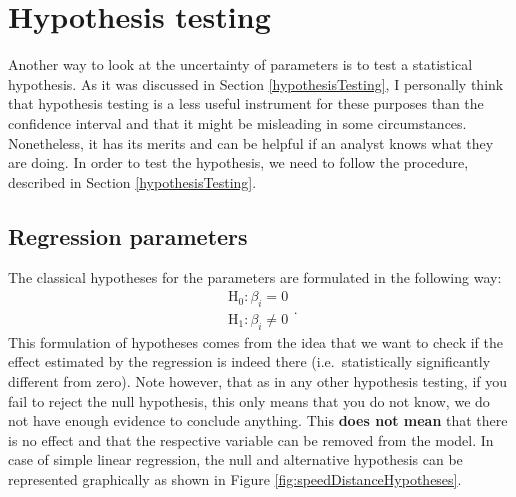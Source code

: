 \documentclass[
]{book}
\theoremstyle{definition}
\theoremstyle{definition}
\theoremstyle{definition}
\theoremstyle{definition}
\theoremstyle{remark}
\begin{document}
\hypertarget{hypothesis-testing}{%
\section{Hypothesis testing}\label{hypothesis-testing}}

Another way to look at the uncertainty of parameters is to test a statistical hypothesis. As it was discussed in Section \ref{hypothesisTesting}, I personally think that hypothesis testing is a less useful instrument for these purposes than the confidence interval and that it might be misleading in some circumstances. Nonetheless, it has its merits and can be helpful if an analyst knows what they are doing. In order to test the hypothesis, we need to follow the procedure, described in Section \ref{hypothesisTesting}.

\hypertarget{regression-parameters}{%
\subsection{Regression parameters}\label{regression-parameters}}

The classical hypotheses for the parameters are formulated in the following way:
\begin{equation}
    \begin{aligned}
        \mathrm{H}_0: \beta_i = 0 \\
        \mathrm{H}_1: \beta_i \neq 0
    \end{aligned} .
    \label{eq:regressionHypothesis01}
\end{equation}
This formulation of hypotheses comes from the idea that we want to check if the effect estimated by the regression is indeed there (i.e.~statistically significantly different from zero). Note however, that as in any other hypothesis testing, if you fail to reject the null hypothesis, this only means that you do not know, we do not have enough evidence to conclude anything. This \textbf{does not mean} that there is no effect and that the respective variable can be removed from the model. In case of simple linear regression, the null and alternative hypothesis can be represented graphically as shown in Figure \ref{fig:speedDistanceHypotheses}.
\end{document}
